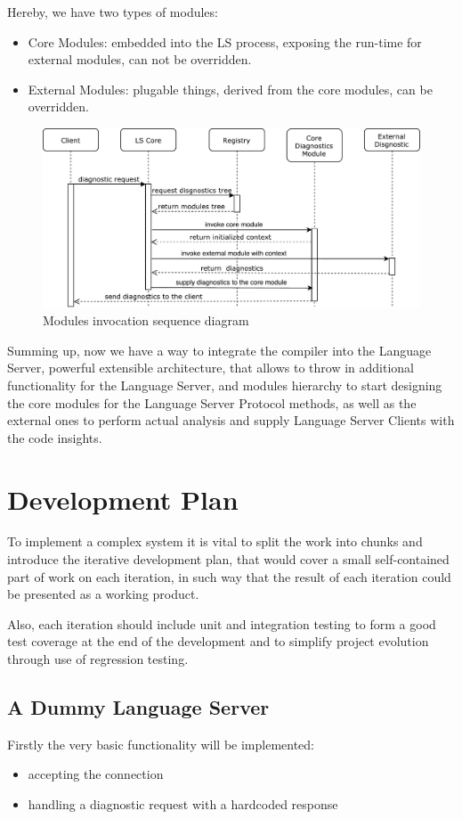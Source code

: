 Hereby, we have two types of modules:
\begin{itemize}
    \item Core Modules: embedded into the LS process, exposing the run-time for external modules, can not be overridden.
    \item External Modules: plugable things, derived from the core modules, can be overridden.
\end{itemize}

\begin{figure}[H]
    \centering
    \includegraphics[width=1.0\textwidth]{figs/modules_sd.pdf}
    \caption{Modules invocation sequence diagram}
\end{figure}

Summing up, now we have a way to integrate the compiler into the Language Server, powerful extensible architecture,
that allows to throw in additional functionality for the Language Server, 
and modules hierarchy to start designing the core modules for the Language Server Protocol methods, as well as
the external ones to perform actual analysis and supply Language Server Clients with the code insights.

\section{Development Plan}
To implement a complex system it is vital to split the work into chunks and introduce
the iterative development plan, that would cover a small self-contained part of work on each iteration,
in such way that the result of each iteration could be presented as a working product.

Also, each iteration should include unit and integration testing to form a good test coverage
at the end of the development and to simplify project evolution through use of regression testing.

\subsection{A Dummy Language Server}
Firstly the very basic functionality will be implemented: 
\begin{itemize}
    \item accepting the connection
    \item handling a diagnostic request with a hardcoded response
\end{itemize}

